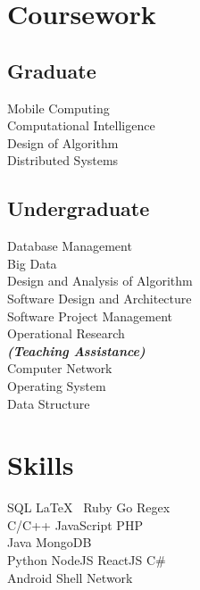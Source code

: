 \documentclass[letterpaper]{deedy-resume} %
\begin{document}
\begin{minipage}[t]{0.33\textwidth}

\section{Coursework}

\subsection{Graduate}
Mobile Computing \\
Computational Intelligence \\
Design of Algorithm \\
Distributed Systems \\
\sectionspace

\subsection{Undergraduate}
Database Management \\
Big Data \\
Design and Analysis of Algorithm \\
Software Design and Architecture \\
Software Project Management \\
Operational Research \\
{\footnotesize \textit{\textbf{(Teaching Assistance) }}} \\
Computer Network \\
Operating System \\
Data Structure
\sectionspace


\section{Skills}

SQL \textbullet{} \LaTeX\ \textbullet{} Ruby \textbullet{} Go \textbullet{} Regex \\
C/C++ \textbullet{} JavaScript \textbullet{} PHP \\
Java \textbullet{} MongoDB \\
Python \textbullet{} NodeJS \textbullet{} ReactJS \textbullet{} C\# \\
Android \textbullet{} Shell \textbullet{} Network
\sectionspace

\end{minipage} %
\end{document}
